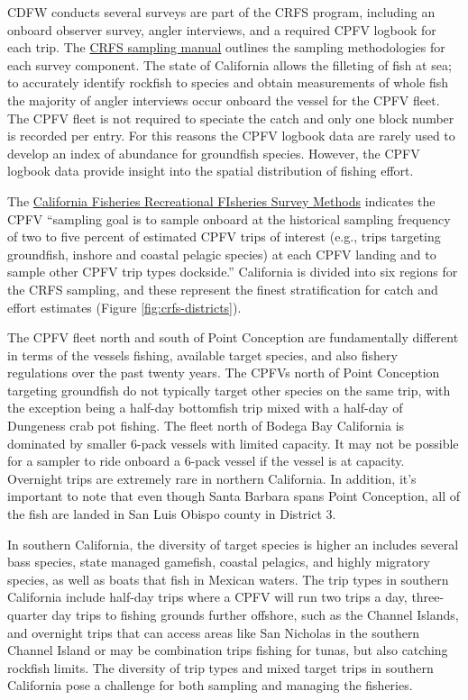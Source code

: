 \documentclass[11pt,
  english,
  letterpaper,
]{article}
\begin{document}
CDFW conducts several surveys are part of the CRFS program, including an onboard observer survey, angler interviews, and a required CPFV logbook for each trip. The \href{https://nrm.dfg.ca.gov/FileHandler.ashx?DocumentID=62348\&inline}{CRFS sampling manual} outlines the sampling methodologies for each survey component. The state of California allows the filleting of fish at sea; to accurately identify rockfish to species and obtain measurements of whole fish the majority of angler interviews occur onboard the vessel for the CPFV fleet. The CPFV fleet is not required to speciate the catch and only one block number is recorded per entry. For this reasons the CPFV logbook data are rarely used to develop an index of abundance for groundfish species. However, the CPFV logbook data provide insight into the spatial distribution of fishing effort.

The \href{https://nrm.dfg.ca.gov/FileHandler.ashx?DocumentID=36136\&inline}{California Fisheries Recreational FIsheries Survey Methods} indicates the CPFV ``sampling goal is to sample onboard at the historical sampling frequency of two to five percent of estimated CPFV trips of interest (e.g., trips targeting groundfish, inshore and coastal pelagic species) at each CPFV landing and to sample other CPFV trip types dockside.'' California is divided into six regions for the CRFS sampling, and these represent the finest stratification for catch and effort estimates (Figure \ref{fig:crfs-districts}).

The CPFV fleet north and south of Point Conception are fundamentally different in terms of the vessels fishing, available target species, and also fishery regulations over the past twenty years. The CPFVs north of Point Conception targeting groundfish do not typically target other species on the same trip, with the exception being a half-day bottomfish trip mixed with a half-day of Dungeness crab pot fishing. The fleet north of Bodega Bay California is dominated by smaller 6-pack vessels with limited capacity. It may not be possible for a sampler to ride onboard a 6-pack vessel if the vessel is at capacity. Overnight trips are extremely rare in northern California. In addition, it's important to note that even though Santa Barbara spans Point Conception, all of the fish are landed in San Luis Obispo county in District 3.

In southern California, the diversity of target species is higher an includes several bass species, state managed gamefish, coastal pelagics, and highly migratory species, as well as boats that fish in Mexican waters. The trip types in southern California include half-day trips where a CPFV will run two trips a day, three-quarter day trips to fishing grounds further offshore, such as the Channel Islands, and overnight trips that can access areas like San Nicholas in the southern Channel Island or may be combination trips fishing for tunas, but also catching rockfish limits. The diversity of trip types and mixed target trips in southern California pose a challenge for both sampling and managing the fisheries.
\end{document}
